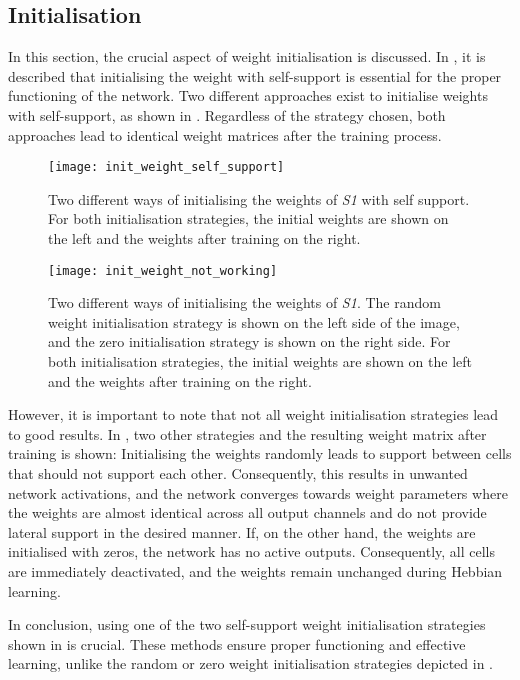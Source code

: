 \subsection{Initialisation}
In this section, the crucial aspect of weight initialisation is discussed.
In , it is described that initialising the weight with self-support is essential for the proper functioning of the network.
Two different approaches exist to initialise weights with self-support, as shown in .
Regardless of the strategy chosen, both approaches lead to identical weight matrices after the training process.
\begin{figure}[h]
    \centering
    \texttt{[image: init\_weight\_self\_support]}
    \caption[Weight initialisation with self-support]{Two different ways of initialising the weights of \emph{S1} with self support. For both initialisation strategies, the initial weights are shown on the left and the weights after training on the right.}
\end{figure}
\begin{figure}[h]
    \centering
    \texttt{[image: init\_weight\_not\_working]}
    \caption[Random weight initialisation]{Two different ways of initialising the weights of \emph{S1}. The random weight initialisation strategy is shown on the left side of the image, and the zero initialisation strategy is shown on the right side. For both initialisation strategies, the initial weights are shown on the left and the weights after training on the right.}
\end{figure}

However, it is important to note that not all weight initialisation strategies lead to good results. 
In , two other strategies and the resulting weight matrix after training is shown:
Initialising the weights randomly leads to support between cells that should not support each other.
Consequently, this results in unwanted network activations, and the network converges towards weight parameters where the weights are almost identical across all output channels and do not provide lateral support in the desired manner.
If, on the other hand, the weights are initialised with zeros, the network has no active outputs. Consequently, all cells are immediately deactivated, and the weights remain unchanged during Hebbian learning.

In conclusion, using one of the two self-support weight initialisation strategies shown in  is crucial. These methods ensure proper functioning and effective learning, unlike the random or zero weight initialisation strategies depicted in .

